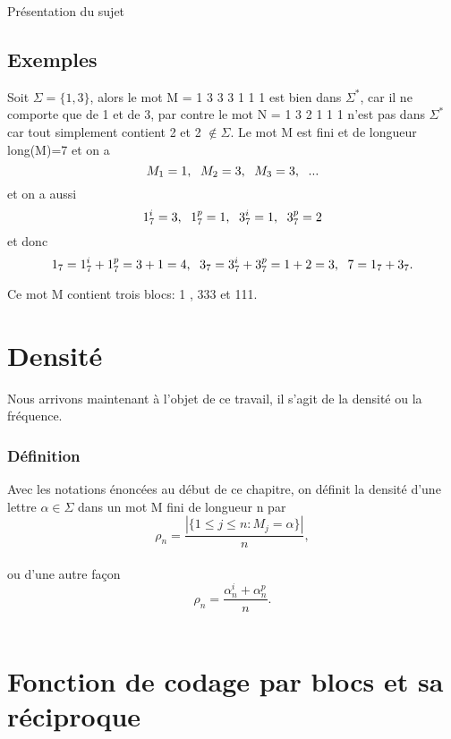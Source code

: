\documentclass[12pt,a4paper,oneside]{book}
\begin{document}
\begin{titlepage}
\begin{chapter}{Présentation du sujet}
 \subsection{Exemples}
\par Soit $\Sigma = \{1,3\}$, alors le mot M = 1 3 3 3 1 1 1 est bien dans $\Sigma^*$, car il ne comporte que de 1 et de 3, par contre le mot N = 1 3 2 1 1 1 n'est pas dans $\Sigma^*$ car tout simplement contient 2 et 2 $\notin \Sigma$. Le mot M est fini et de longueur long(M)=7 et on a $$M_1 = 1,\hspace{0,5\baselineskip}  M_2 = 3,\hspace{0,5\baselineskip} M_3 = 3,\hspace{0,5\baselineskip} ... $$ et on a aussi \\
 \[ 1_7^i=3 , \hspace{0,5\baselineskip}1_7^p=1 , \hspace{0,5\baselineskip} 3_7^i=1 ,\hspace{0,5\baselineskip}  3_7^p=2 \] 
 et donc
\[ 1_7 = 1_7^i + 1_7^p =3+1=4 , \hspace{0,5\baselineskip} 3_7=3_7^i+3_7^p=1+2=3,\hspace{0,5\baselineskip}   7=1_7+3_7 .\]
\par Ce mot M contient trois blocs: \hspace{0,5\baselineskip} 1 \hspace{0,5\baselineskip} , \hspace{0,5\baselineskip} 333 \hspace{0,5\baselineskip} et\hspace{0,5\baselineskip} 111.
\section{Densité}
\par Nous arrivons maintenant à l'objet de ce travail, il s'agit de la densité ou la fréquence.
\subsubsection{Définition}
\par Avec les notations énoncées au début de ce chapitre, on définit la densité d'une lettre $\alpha \in \Sigma$ dans un mot M fini de longueur n par \[ \rho_n = \frac{|\{ 1 \leq j \leq n : M_j =\alpha \} |}{n} ,\]   \\ 
ou d'une autre façon \[ \rho_n = \frac{\alpha_n^i+\alpha_n^p}{n} .\]   \\
\section{Fonction de codage par blocs et sa réciproque}

\end{chapter}
\end{titlepage}
\end{document}
